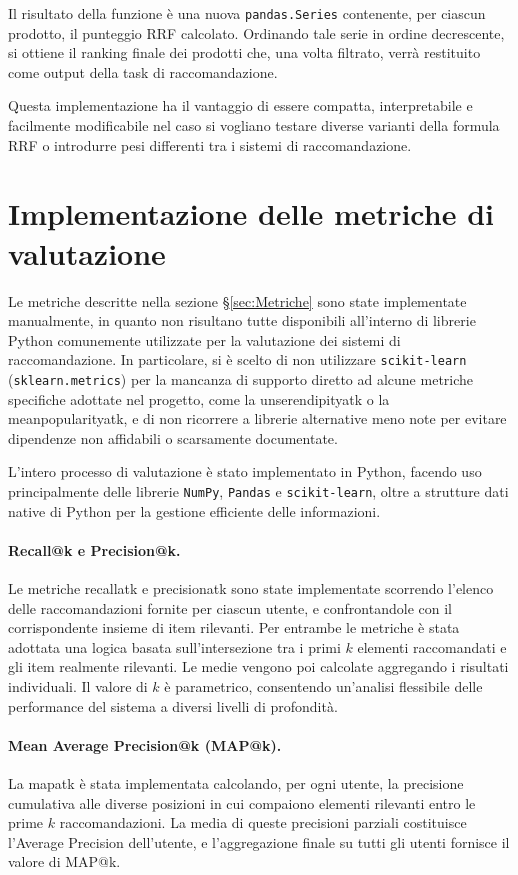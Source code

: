 Il risultato della funzione è una nuova \texttt{pandas.Series} contenente, per ciascun prodotto, il punteggio RRF calcolato. Ordinando tale serie in ordine decrescente, si ottiene il ranking finale dei prodotti che, una volta filtrato, verrà restituito come output della task di raccomandazione.

Questa implementazione ha il vantaggio di essere compatta, interpretabile e facilmente modificabile nel caso si vogliano testare diverse varianti della formula RRF o introdurre pesi differenti tra i sistemi di raccomandazione.


\section{Implementazione delle metriche di valutazione}

Le metriche descritte nella sezione \S\ref{sec:Metriche} sono state implementate manualmente, in quanto non risultano tutte disponibili all'interno di librerie Python comunemente utilizzate per la valutazione dei sistemi di raccomandazione. In particolare, si è scelto di non utilizzare \texttt{scikit-learn} (\texttt{sklearn.metrics}) per la mancanza di supporto diretto ad alcune metriche specifiche adottate nel progetto, come la \gls{unserendipityatk} o la \gls{meanpopularityatk}, e di non ricorrere a librerie alternative meno note per evitare dipendenze non affidabili o scarsamente documentate.

L’intero processo di valutazione è stato implementato in Python, facendo uso principalmente delle librerie \texttt{NumPy}, \texttt{Pandas} e \texttt{scikit-learn}, oltre a strutture dati native di Python per la gestione efficiente delle informazioni.

\paragraph{Recall@k e Precision@k.}
Le metriche \gls{recallatk} e \gls{precisionatk} sono state implementate scorrendo l’elenco delle raccomandazioni fornite per ciascun utente, e confrontandole con il corrispondente insieme di item rilevanti. Per entrambe le metriche è stata adottata una logica basata sull’intersezione tra i primi $k$ elementi raccomandati e gli item realmente rilevanti. Le medie vengono poi calcolate aggregando i risultati individuali. Il valore di $k$ è parametrico, consentendo un'analisi flessibile delle performance del sistema a diversi livelli di profondità.

\paragraph{Mean Average Precision@k (MAP@k).}
La \gls{mapatk} è stata implementata calcolando, per ogni utente, la precisione cumulativa alle diverse posizioni in cui compaiono elementi rilevanti entro le prime $k$ raccomandazioni. La media di queste precisioni parziali costituisce l'Average Precision dell’utente, e l’aggregazione finale su tutti gli utenti fornisce il valore di MAP@k.

